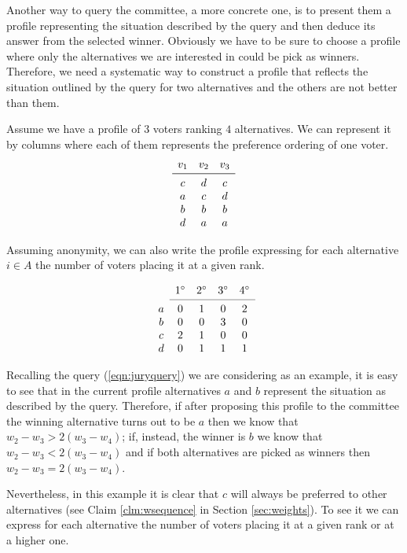 Another way to query the committee, a more concrete one, is to present them a profile representing the situation described by the query and then deduce its answer from the selected winner. Obviously we have to be sure to choose a profile where only the alternatives we are interested in could be pick as winners. Therefore, we need a systematic way to construct a profile that reflects the situation outlined by the query for two alternatives and the others are not better than them.


Assume we have a profile of $3$ voters ranking $4$ alternatives. We can represent it by columns where each of them represents the preference ordering of one voter.
\[
\begin{array}{ccc}
v_1
& v_2
& v_3 \\
\midrule 
c
& d
& c \\
a
& c
& d \\
b
& b
& b \\
d
& a
& a \\
\end{array}
\]

Assuming anonymity, we can also write the profile expressing for each alternative $i \in A$ the number of voters placing it at a given rank.

\[
\begin{array}{ccccc}
& 1^\circ
& 2^\circ
& 3^\circ
& 4^\circ \\
\cmidrule{2-5}
a 
& 0
& 1
& 0
& 2 \\
b
& 0
& 0
& 3
& 0 \\
c
& 2
& 1
& 0
& 0 \\
d
& 0
& 1
& 1
& 1 \\
\end{array}
\]

Recalling the query (\ref{eqn:juryquery}) we are considering as an example, it is easy to see that in the current profile alternatives $a$ and $b$ represent the situation as described by the query. Therefore, if after proposing this profile to the committee the winning alternative turns out to be $a$ then we know that $w_{2} - w_{3} > 2(w_{3} - w_{4})$; if, instead, the winner is $b$ we know that $w_{2} - w_{3} < 2(w_{3} - w_{4})$ and if both alternatives are picked as winners then $w_{2} - w_{3} = 2(w_{3} - w_{4})$. 

Nevertheless, in this example it is clear that $c$ will always be preferred to other alternatives (see Claim \ref{clm:wsequence} in Section \ref{sec:weights}). To see it we can express for each alternative the number of voters placing it at a given rank or at a higher one.

